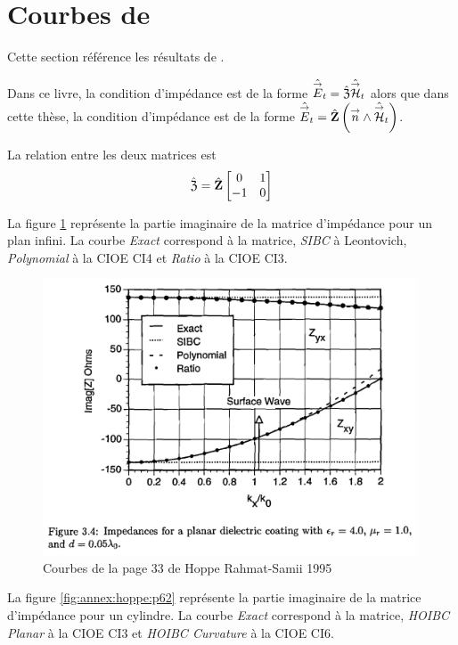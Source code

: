 \section[Courbes de HOPPE 1995]{Courbes de \cite{hoppe_impedance_1995}}
\label{sec:annexe:hoppe}
Cette section référence les résultats de \cite{hoppe_impedance_1995}. 


Dans ce livre, la condition d'impédance est de la forme \(\hat{{\overset{\rightarrow}{E}}}_t = \hat{\mathfrak{Z}} \hat{{\overset{\rightarrow}{\mathcal{H}}}}_t\) alors que dans cette thèse, la condition d'impédance est de la forme \(\hat{{\overset{\rightarrow}{E}}}_t = \hat{\mathbf{Z}} \left({\overset{\rightarrow}{n}} \wedge \hat{{\overset{\rightarrow}{\mathcal{H}}}}_t\right)\). 

La relation entre les deux matrices est
\begin{equation}
  \hat{\mathfrak{Z}} = \hat{\mathbf{Z}}\begin{bmatrix}0&1\\-1&0\end{bmatrix}
\end{equation}

La figure \ref{fig:annex:hoppe:p33} représente la partie imaginaire de la matrice d'impédance pour un plan infini. La courbe \textit{Exact} correspond à la matrice, \textit{SIBC} à Leontovich, \textit{Polynomial} à la CIOE CI4 et \textit{Ratio} à la CIOE CI3.

\begin{figure}[h!tb]
    \includegraphics[width=0.99\textwidth]{images/hoppe/p33_imp_cylindre.png}
    \caption{Courbes de la page 33 de Hoppe Rahmat-Samii 1995}
    \label{fig:annex:hoppe:p33}
\end{figure}

La figure \ref{fig:annex:hoppe:p62} représente la partie imaginaire de la matrice d'impédance  pour un cylindre. La courbe \textit{Exact} correspond à la matrice, \textit{HOIBC Planar} à la CIOE CI3 et \textit{HOIBC Curvature} à la CIOE CI6.

